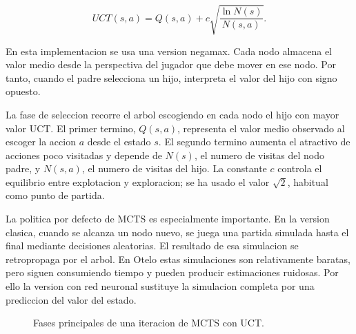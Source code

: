 \documentclass[conference,a4paper]{IEEEtran}
\begin{document}
\begin{equation}
UCT(s,a) = Q(s,a) + c \sqrt{\frac{\ln N(s)}{N(s,a)}}.
\end{equation}

En esta implementacion se usa una version negamax. Cada nodo almacena el valor
medio desde la perspectiva del jugador que debe mover en ese nodo. Por tanto,
cuando el padre selecciona un hijo, interpreta el valor del hijo con signo
opuesto.

La fase de seleccion recorre el arbol escogiendo en cada nodo el hijo con mayor
valor UCT. El primer termino, \(Q(s,a)\), representa el valor medio observado al
escoger la accion \(a\) desde el estado \(s\). El segundo termino aumenta el
atractivo de acciones poco visitadas y depende de \(N(s)\), el numero de visitas
del nodo padre, y \(N(s,a)\), el numero de visitas del hijo. La constante \(c\)
controla el equilibrio entre explotacion y exploracion; se ha usado el valor
\(\sqrt{2}\), habitual como punto de partida.

La politica por defecto de MCTS es especialmente importante. En la version
clasica, cuando se alcanza un nodo nuevo, se juega una partida simulada hasta el
final mediante decisiones aleatorias. El resultado de esa simulacion se
retropropaga por el arbol. En Otelo estas simulaciones son relativamente baratas,
pero siguen consumiendo tiempo y pueden producir estimaciones ruidosas. Por ello
la version con red neuronal sustituye la simulacion completa por una prediccion
del valor del estado.

\begin{figure}[t]
\centering
{}
\caption{Fases principales de una iteracion de MCTS con UCT.}
\label{fig:fases-uct}
\end{figure}
\end{document}
